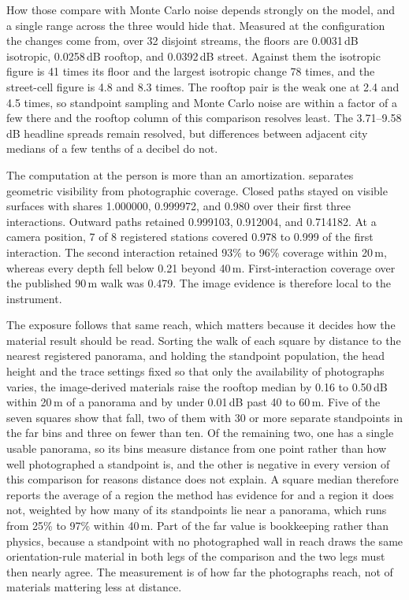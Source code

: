 \documentclass[journal]{IEEEtran}
\begin{document}
How those compare with Monte Carlo noise depends strongly on the model, and a
single range across the three would hide that. Measured at the configuration the
changes come from, over 32 disjoint streams, the floors are 0.0031\,dB
isotropic, 0.0258\,dB rooftop, and 0.0392\,dB street. Against them the isotropic
figure is 41 times its floor and the largest isotropic change 78 times, and the
street-cell figure is 4.8 and 8.3 times. The rooftop pair is the weak one at 2.4
and 4.5 times, so standpoint sampling and Monte Carlo noise are within a factor
of a few there and the rooftop column of this comparison resolves least. The
3.71--9.58\,dB headline spreads remain resolved, but differences between adjacent
city medians of a few tenths of a decibel do not.

The computation at the person is more than an amortization.
 separates geometric visibility from photographic
coverage. Closed paths stayed on visible surfaces with shares 1.000000,
0.999972, and 0.980 over their first three interactions. Outward paths retained
0.999103, 0.912004, and 0.714182. At a camera position, 7 of 8 registered
stations covered 0.978 to 0.999 of the first interaction. The second interaction
retained 93\% to 96\% coverage within 20\,m, whereas every depth fell below
0.21 beyond 40\,m. First-interaction coverage over the published 90\,m walk was
0.479. The image evidence is therefore local to the instrument.

The exposure follows that same reach, which matters because it decides how the
material result should be read. Sorting the walk of each square by distance to
the nearest registered panorama, and holding the standpoint population, the head
height and the trace settings fixed so that only the availability of photographs
varies, the image-derived materials raise the rooftop median by 0.16 to 0.50\,dB
within 20\,m of a panorama and by under 0.01\,dB past 40 to 60\,m. Five of the
seven squares show that fall, two of them with 30 or more separate standpoints
in the far bins and three on fewer than ten. Of the remaining two, one has a
single usable panorama, so its bins measure distance from one point rather than
how well photographed a standpoint is, and the other is negative in every
version of this comparison for reasons distance does not explain. A square
median therefore reports the average of a region the method has evidence for and
a region it does not, weighted by how many of its standpoints lie near a
panorama, which runs from 25\% to 97\% within 40\,m. Part of the far value is
bookkeeping rather than physics, because a standpoint with no photographed wall
in reach draws the same orientation-rule material in both legs of the comparison
and the two legs must then nearly agree. The measurement is of how far the
photographs reach, not of materials mattering less at distance.
\end{document}
